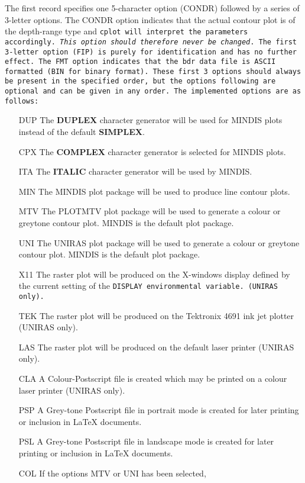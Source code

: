 The first record specifies one 5-character option (CONDR) followed by a series
of 3-letter options. The CONDR option indicates that the actual contour plot
is of the depth-range type and \tt cplot \rm will interpret the parameters 
accordingly. {\em This option should therefore never be changed}. The first
3-letter option (FIP) is purely for identification and has no further effect.
The FMT option  indicates that the \tt bdr \rm  data file is ASCII
formatted 
(BIN for
binary format). These first 3 options should always be present in the specified
order, but the options following are optional and can be given in any
order.  The
implemented options are as follows:
\begin{itemize}
\item[DUP] The {\bf DUPLEX} character generator will be used for MINDIS plots
	 instead of the default {\bf SIMPLEX}.
\item[CPX] The {\bf COMPLEX} character generator is selected for
MINDIS plots.
\item[ITA] The {\bf ITALIC} character generator will be used by MINDIS.
\item[MIN] The MINDIS plot package will be used to produce line contour plots.
\item[MTV] The PLOTMTV plot package will be used to generate a colour or 
greytone contour plot. MINDIS is the default plot package.
\item[UNI] The UNIRAS plot package will be used to generate a colour or 
greytone contour plot. MINDIS is the default plot package.
\item[X11] The raster plot will be produced on the X-windows display
defined by the current setting of the \tt DISPLAY \rm environmental variable. 
        (UNIRAS only).
\item[TEK] The raster plot will be produced on the Tektronix 4691 ink jet
	plotter (UNIRAS only).
\item[LAS] The raster plot will be produced on the default laser 
	printer (UNIRAS only).
\item[CLA] A Colour-Postscript file is created which may be printed on
	a colour laser printer (UNIRAS only).  
\item[PSP] A Grey-tone Postscript file in portrait mode is created for
later printing or inclusion in LaTeX documents.
\item[PSL] A Grey-tone Postscript file in landscape mode is created for
later printing or inclusion in LaTeX documents.
\item[COL] If the options MTV or UNI has been selected, 

\end{itemize}
